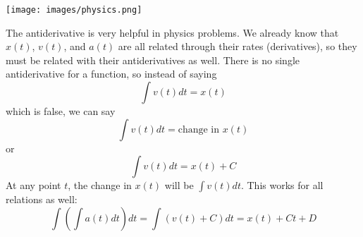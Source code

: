\documentclass[../revisedmain.tex]{subfiles}
\begin{document}
	\vspace{.125in}
	\begin{center}
		\texttt{[image: images/physics.png]}
	\end{center}
	\vspace{.25in}
The antiderivative is very helpful in physics problems. We already know that $x(t)$, $v(t)$, and $a(t)$ are all related through their rates (derivatives), so they must be related with their antiderivatives as well. There is no single antiderivative for a function, so instead of saying $$\int v(t) dt=x(t)$$ which is false, we can say$$\int v(t)dt=\text{change in }x(t)$$or$$\int v(t)dt=x(t)+C$$At any point $t$, the change in $x(t)$ will be $\int v(t) dt$. This works for all relations as well:$$\int\left(\int a(t) dt\right)dt=\int (v(t)+C)dt=x(t)+Ct+D$$\\
\end{document}
